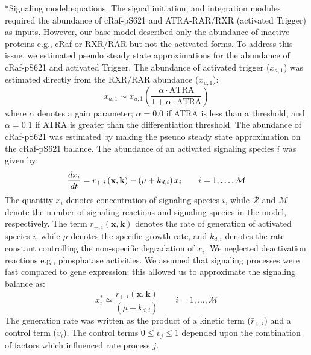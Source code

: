 \documentclass[12pt]{article}
\makeatletter
\renewcommand\subsubsection{\@startsection
	{subsubsection}{2}{0mm}
	{-0.05in}
	{-0.5\baselineskip}
	{\normalfont\normalsize\itshape}}
\makeatother
\begin{document}
\subsubsection*{Signaling model equations.}
The signal initiation, and integration modules required the abundance of cRaf-pS621 and ATRA-RAR/RXR (activated Trigger) as inputs.
However, our base model described only the abundance of inactive proteins e.g., cRaf or RXR/RAR but not the activated forms.
To address this issue, we estimated pseudo steady state approximations for the abundance of cRaf-pS621 and activated Trigger.
The abundance of activated trigger ($x_{a,1}$) was estimated directly from the RXR/RAR abundance ($x_{u,1}$):
\begin{equation}
	x_{a,1} \sim x_{u,1}\left(\frac{\alpha\cdot{\mathrm{ATRA}}}{1+\alpha\cdot\mathrm{ATRA}}\right)
\end{equation}
where $\alpha$ denotes a gain parameter; $\alpha = 0.0$ if ATRA is less than a threshold, and $\alpha = 0.1$ if ATRA is greater than the differentiation threshold.
The abundance of cRaf-pS621 was estimated by making the pseudo steady state approximation on the cRaf-pS621 balance.
The abundance of an activated signaling species $i$ was given by:
\begin{equation}
	\frac{dx_{i}}{dt}  =  r_{+,i}\left(\mathbf{x},\mathbf{k}\right) - \left(\mu+k_{d,i}\right)x_{i}\qquad{i=1,\hdots,\mathcal{M}}\\
\end{equation}
The quantity $x_{i}$ denotes concentration of signaling species $i$, while $\mathcal{R}$ and $\mathcal{M}$ denote the number of signaling reactions and signaling species in the model,
respectively. The term $r_{+,i}\left(\mathbf{x},\mathbf{k}\right)$ denotes the rate of generation of activated species $i$,
while $\mu$ denotes the specific growth rate, and $k_{d,i}$ denotes the rate constant controlling the non-specific degradation of $x_{i}$.
We neglected deactivation reactions e.g., phosphatase activities.
We assumed that signaling processes were fast compared to gene expression; this allowed us to approximate the signaling balance as:
\begin{equation}
	x_{i}^{*} \simeq \frac{r_{+,i}\left(\mathbf{x},\mathbf{k}\right)}{\left(\mu+k_{d,i}\right)} \qquad{i=1,\hdots,\mathcal{M}}
\end{equation}
The generation rate was written as the product of a kinetic term ($\bar{r}_{+,i}$) and a control term ($v_{i}$).
The control terms $0\leq v_{j}\leq 1$ depended upon the combination of factors which influenced rate process $j$.
\end{document}
